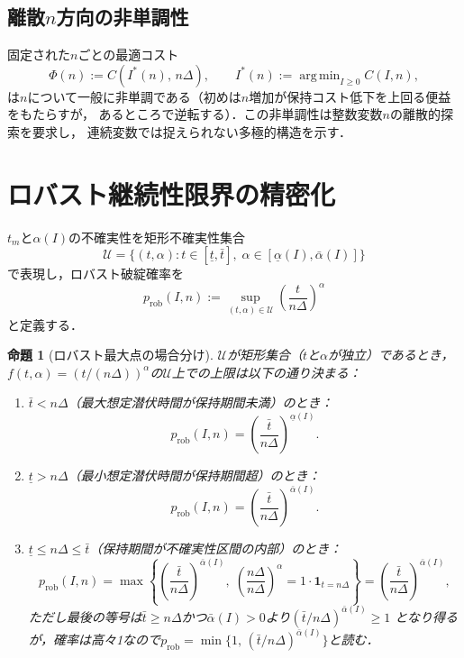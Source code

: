 \documentclass[12pt,a4paper]{article}
\theoremstyle{plain}
\newtheorem{proposition}[theorem]{命題}
\theoremstyle{definition}
\theoremstyle{remark}
\newcommand{\calU}{\mathcal{U}}
\DeclareMathOperator*{\argmin}{arg\,min}
\begin{document}
\subsection{離散$n$方向の非単調性}

固定された$n$ごとの最適コスト
\[
  \Phi(n) := C(I^*(n),\, n\Delta), \qquad I^*(n) := \argmin_{I\ge0} C(I,n),
\]
は$n$について一般に非単調である（初めは$n$増加が保持コスト低下を上回る便益をもたらすが，
あるところで逆転する）．この非単調性は整数変数$n$の離散的探索を要求し，
連続変数では捉えられない多極的構造を示す．

\section{ロバスト継続性限界の精密化}
\label{sec:robust}

$t_m$と$\alpha(I)$の不確実性を矩形不確実性集合
\[
  \calU = \bigl\{(t,\alpha) : t \in [\underline{t},\bar{t}],\;
  \alpha \in [\underline{\alpha}(I),\bar{\alpha}(I)]\bigr\}
\]
で表現し，ロバスト破綻確率を
\[
  p_{\mathrm{rob}}(I,n) := \sup_{(t,\alpha)\in\calU} \left(\frac{t}{n\Delta}\right)^{\alpha}
\]
と定義する．

\begin{proposition}[ロバスト最大点の場合分け]\label{prop:robust}
$\calU$が矩形集合（$t$と$\alpha$が独立）であるとき，
$f(t,\alpha) = (t/(n\Delta))^\alpha$の$\calU$上での上限は以下の通り決まる：

\begin{enumerate}[label=(\alph*)]
  \item $\bar{t} < n\Delta$（最大想定潜伏時間が保持期間未満）のとき：
    \[
      p_{\mathrm{rob}}(I,n) = \left(\frac{\bar{t}}{n\Delta}\right)^{\underline{\alpha}(I)}.
    \]

  \item $\underline{t} > n\Delta$（最小想定潜伏時間が保持期間超）のとき：
    \[
      p_{\mathrm{rob}}(I,n) = \left(\frac{\bar{t}}{n\Delta}\right)^{\bar{\alpha}(I)}.
    \]

  \item $\underline{t} \le n\Delta \le \bar{t}$（保持期間が不確実性区間の内部）のとき：
    \[
      p_{\mathrm{rob}}(I,n) = \max\!\left\{
        \left(\frac{\bar{t}}{n\Delta}\right)^{\bar{\alpha}(I)},\;
        \left(\frac{n\Delta}{n\Delta}\right)^{\alpha} = 1 \cdot \mathbf{1}_{t=n\Delta}
      \right\}
      = \left(\frac{\bar{t}}{n\Delta}\right)^{\bar{\alpha}(I)},
    \]
    ただし最後の等号は$\bar{t} \ge n\Delta$かつ$\bar{\alpha}(I) > 0$より$(\bar{t}/n\Delta)^{\bar{\alpha}(I)} \ge 1$
    となり得るが，確率は高々1なので$p_{\mathrm{rob}} = \min\bigl\{1,\, (\bar{t}/n\Delta)^{\bar{\alpha}(I)}\bigr\}$と読む．
\end{enumerate}
\end{proposition}
\end{document}
